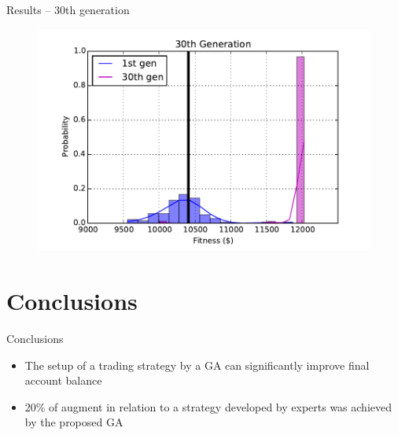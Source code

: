 \documentclass[12pt,portuguese]{beamer}
\begin{document}
\begin{frame}{Results -- 30th generation}
	\begin{figure}[h]
	\centering
	\includegraphics[width=0.9\columnwidth]{images/30l_100.pdf}
	\end{figure}
\end{frame}

\section{Conclusions}
\begin{frame}{Conclusions}
	\begin{itemize}
		\item The setup of a trading strategy by a GA can significantly improve final account balance
		\item 20\% of augment in relation to a strategy developed by experts was achieved by the proposed GA
	\end{itemize}
\end{frame}
\end{document}
